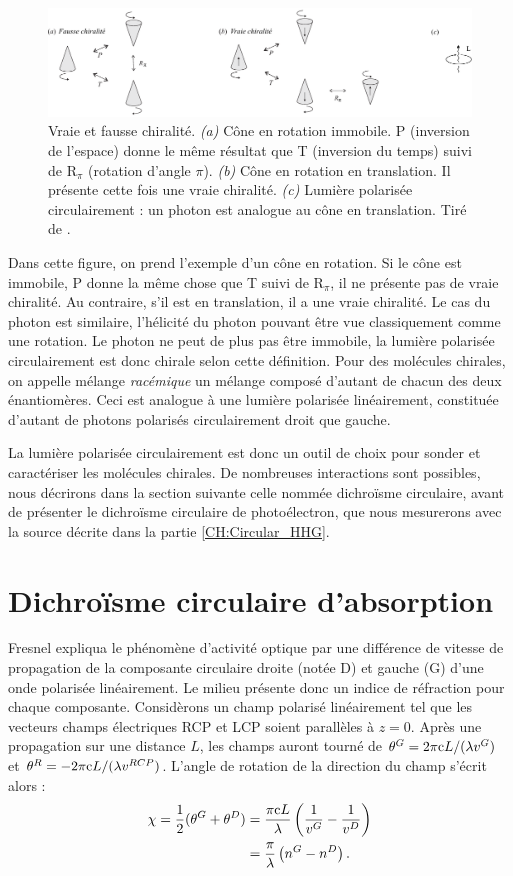 \begin{figure}[!ht]
\centering
\includegraphics[width=.9\columnwidth]{Figures/Chirality/truefalsechir.pdf}%
\caption{Vraie et fausse chiralité. \textit{(a)} Cône en rotation immobile. P (inversion de l'espace) donne le même résultat que T (inversion du temps) suivi de $\text{R}_{\pi}$ (rotation d'angle $\pi$). \textit{(b)} Cône en rotation en translation. Il présente cette fois une vraie chiralité. \textit{(c)} Lumière polarisée circulairement : un photon est analogue au cône en translation. Tiré de .}
\label{fig:truefalsechir}
\end{figure}

Dans cette figure, on prend l'exemple d'un cône en rotation. Si le cône est immobile, P donne la même chose que T suivi de $\text{R}_{\pi}$, il ne présente pas de vraie chiralité. Au contraire, s'il est en translation, il a une vraie chiralité. Le cas du photon est similaire, l'hélicité du photon pouvant être vue classiquement comme une rotation. Le photon ne peut de plus pas être immobile, la lumière polarisée circulairement est donc chirale selon cette définition. Pour des molécules chirales, on appelle mélange \textit{racémique} un mélange composé d'autant de chacun des deux énantiomères. Ceci est analogue à une lumière polarisée linéairement, constituée d'autant de photons polarisés circulairement droit que gauche. 

La lumière polarisée circulairement est donc un outil de choix pour sonder et caractériser les molécules chirales. De nombreuses interactions sont possibles, nous décrirons dans la section suivante celle nommée dichroïsme circulaire, avant de présenter le dichroïsme circulaire de photoélectron, que nous mesurerons avec la source décrite dans la partie \ref{CH:Circular_HHG}.

\section{Dichroïsme circulaire d'absorption}
Fresnel expliqua le phénomène d'activité optique par une différence de vitesse de propagation de la composante circulaire droite (notée D) et gauche (G) d'une onde polarisée linéairement. Le milieu présente donc un indice de réfraction pour chaque composante. Considèrons un champ polarisé linéairement tel que les vecteurs champs électriques RCP et LCP soient parallèles à $z = 0$. Après une propagation sur une distance $L$, les champs auront tourné de $\theta^{G}=2\pi\mathrm{c} L/(\lambda v^{G})$ et $\theta^{R}=-2\pi\mathrm{c} L/(\lambda v^{RCP})$. L'angle de rotation de la direction du champ s'écrit alors :
\begin{align*}
\chi = \frac{1}{2}(\theta^{G}+\theta^{D}) &= \frac{\pi\mathrm{c} L}{\lambda}\left(\frac{1}{v^{G}}-\frac{1}{v^{D}}\right)\\
&= \frac{\pi}{\lambda}\left(n^{G}-n^{D}\right).
\end{align*}

